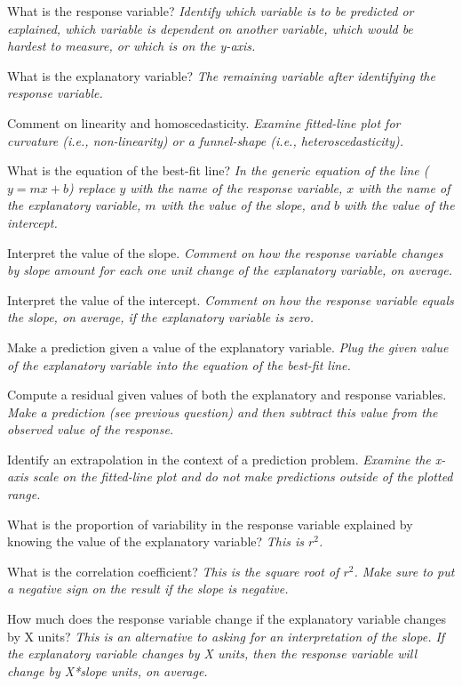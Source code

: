 \documentclass[10pt,openany]{book}\usepackage[]{graphicx}\usepackage[]{color}
\begin{document}
\begin{Enumerate}
  \item What is the response variable?  \textit{Identify which variable is to be predicted or explained, which variable is dependent on another variable, which would be hardest to measure, or which is on the y-axis.}
  \item What is the explanatory variable?  \textit{The remaining variable after identifying the response variable.}
  \item Comment on linearity and homoscedasticity.  \textit{Examine fitted-line plot for curvature (i.e., non-linearity) or a funnel-shape (i.e., heteroscedasticity).}
  \item What is the equation of the best-fit line?  \textit{In the generic equation of the line ($y=mx+b$) replace $y$ with the name of the response variable, $x$ with the name of the explanatory variable, $m$ with the value of the slope, and $b$ with the value of the intercept.}
  \item Interpret the value of the slope.  \textit{Comment on how the response variable changes by slope amount for each one unit change of the explanatory variable, on average.}
  \item Interpret the value of the intercept.  \textit{Comment on how the response variable equals the slope, on average, if the explanatory variable is zero.}
  \item Make a prediction given a value of the explanatory variable.  \textit{Plug the given value of the explanatory variable into the equation of the best-fit line.}
  \item Compute a residual given values of both the explanatory and response variables.  \textit{Make a prediction (see previous question) and then subtract this value from the observed value of the response.}
  \item Identify an extrapolation in the context of a prediction problem.  \textit{Examine the x-axis scale on the fitted-line plot and do not make predictions outside of the plotted range.}
  \item What is the proportion of variability in the response variable explained by knowing the value of the explanatory variable?  \textit{This is $r^{2}$.}
  \item What is the correlation coefficient?  \textit{This is the square root of $r^{2}$.  Make sure to put a negative sign on the result if the slope is negative.}
  \item How much does the response variable change if the explanatory variable changes by X units?  \textit{This is an alternative to asking for an interpretation of the slope.  If the explanatory variable changes by X units, then the response variable will change by X*slope units, on average.}
\end{Enumerate}
\end{document}
